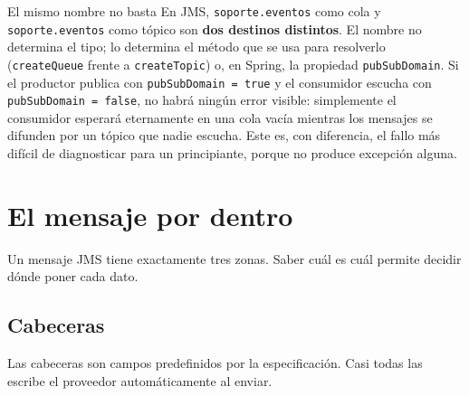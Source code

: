 \documentclass[11pt,a4paper]{book}
\newcommand{\clase}[1]{\texttt{#1}}
\begin{document}
\begin{cajaAviso}{El mismo nombre no basta}
	En JMS, \texttt{soporte.eventos} como cola y \texttt{soporte.eventos} como tópico son \textbf{dos destinos distintos}.
	El nombre no determina el tipo; lo determina el método que se usa para resolverlo (\clase{createQueue} frente a \clase{createTopic}) o, en Spring, la propiedad \texttt{pubSubDomain}.
	Si el productor publica con \texttt{pubSubDomain = true} y el consumidor escucha con \texttt{pubSubDomain = false}, no habrá ningún error visible: simplemente el consumidor esperará eternamente en una cola vacía mientras los mensajes se difunden por un tópico que nadie escucha.
	Este es, con diferencia, el fallo más difícil de diagnosticar para un principiante, porque no produce excepción alguna.
\end{cajaAviso}

\chapter{El mensaje por dentro}
\label{cap:mensaje}

Un mensaje JMS tiene exactamente tres zonas.
Saber cuál es cuál permite decidir dónde poner cada dato.

\section{Cabeceras}

Las cabeceras son campos predefinidos por la especificación.
Casi todas las escribe el proveedor automáticamente al enviar.
\end{document}
